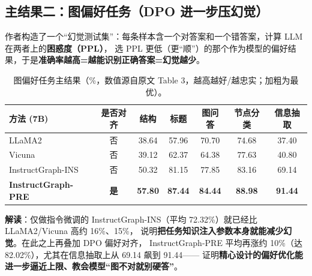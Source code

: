 \documentclass[11pt,UTF8,fontset=fandol]{ctexart}
\begin{document}
\subsection{主结果二：图偏好任务（DPO 进一步压幻觉）}
作者构造了一个“幻觉测试集”：每条样本含一个对答案和一个错答案，计算 LLM 在两者上的\textbf{困惑度（PPL）}，
选 PPL 更低（更“顺”）的那个作为模型的偏好结果，于是\textbf{准确率越高=越能识别正确答案=幻觉越少}。

\begin{table}[H]\centering
\caption{图偏好任务主结果（\%，数值源自原文 Table 3，越高越好/越忠实；加粗为最优）。}
\begin{tabular}{lcccccc}
\toprule
方法 (7B) & 是否对齐 & 结构 & 标题 & 图问答 & 节点分类 & 信息抽取 \\
\midrule
LLaMA2 & 否 & 38.64 & 57.96 & 70.70 & 74.68 & 37.40 \\
Vicuna & 否 & 39.12 & 62.37 & 64.38 & 77.63 & 40.80 \\
InstructGraph-INS & 否 & 50.32 & 81.15 & 77.85 & 83.16 & 69.14 \\
\textbf{InstructGraph-PRE} & \textbf{是} & \textbf{57.80} & \textbf{87.44} & \textbf{84.44} & \textbf{88.98} & \textbf{91.44} \\
\bottomrule
\end{tabular}
\end{table}

\textbf{解读}：仅做指令微调的 InstructGraph-INS（平均 72.32\%）就已经比 LLaMA2/Vicuna 高约 16\%、15\%，
说明\textbf{把任务知识注入参数本身就能减少幻觉}。在此之上再叠加 DPO 偏好对齐，
InstructGraph-PRE 平均再涨约 10\%（达 82.02\%），尤其在信息抽取上从 69.14 飙到 91.44——
证明\textbf{精心设计的偏好优化能进一步逼近上限、教会模型“图不对就别硬答”}。
\end{document}
